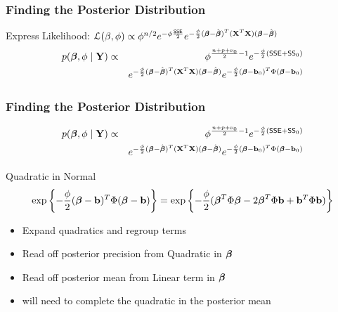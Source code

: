 \documentclass[handout]{beamer}\usepackage[]{graphicx}\usepackage[]{color}
\begin{document}
\begin{frame}
\frametitle{Finding the Posterior Distribution}
Express Likelihood: ${\cal{L}}(\beta, \phi) \propto \phi^{n/2} e^{- \phi \frac{\textsf{SSE}}{2}}
e^{-\frac{\phi}{2} (\boldsymbol{\beta} - \hat{\boldsymbol{\beta}})^T(\mathbf{X}^T\mathbf{X}) (\boldsymbol{\beta} - \hat{\boldsymbol{\beta}})}$ \pause
\begin{eqnarray*}
 p(\boldsymbol{\beta}, \phi \mid \mathbf{Y}) &\propto&  \phi^{\frac {n + p + \nu_0}{ 2} - 1}
 e^{- \frac \phi 2 ( \textsf{SSE} + \textsf{SS}_0) } \\
 & & e^{-\frac{\phi}{2} (\boldsymbol{\beta} - \hat{\boldsymbol{\beta}})^T(\mathbf{X}^T\mathbf{X}) (\boldsymbol{\beta} - \hat{\boldsymbol{\beta}})}
 e^{- \frac{\phi}{2} (\boldsymbol{\beta} - \mathbf{b}_0)^T \Phi (\boldsymbol{\beta} - \mathbf{b}_0) }
\end{eqnarray*} \pause


\end{frame}


\begin{frame}
\frametitle{Finding the Posterior Distribution}
\begin{eqnarray*}
 p(\boldsymbol{\beta}, \phi \mid \mathbf{Y}) &\propto&  \phi^{\frac {n + p + \nu_0}{ 2} - 1}
 e^{- \frac \phi 2 ( \textsf{SSE} + \textsf{SS}_0) } \\
 & & e^{-\frac{\phi}{2} (\boldsymbol{\beta} - \hat{\boldsymbol{\beta}})^T(\mathbf{X}^T\mathbf{X}) (\boldsymbol{\beta} - \hat{\boldsymbol{\beta}})}
 e^{- \frac{\phi}{2} (\boldsymbol{\beta} - \mathbf{b}_0)^T \Phi (\boldsymbol{\beta} - \mathbf{b}_0) }
\end{eqnarray*} \pause

Quadratic in Normal
$$\exp\left\{- \frac{\phi}{2} (\boldsymbol{\beta} - \mathbf{b})^T \Phi (\boldsymbol{\beta} - \mathbf{b}) \right\} = \exp\left\{-
  \frac{\phi}{2} (\boldsymbol{\beta}^T \Phi \boldsymbol{\beta} - 2 \boldsymbol{\beta}^T \Phi \mathbf{b} + \mathbf{b}^T\Phi \mathbf{b} )\right\}$$
\pause

  \begin{itemize}
  \item Expand quadratics and regroup terms \pause
  \item Read off posterior precision from Quadratic in $\boldsymbol{\beta}$ \pause
  \item Read off posterior mean from Linear term in $\boldsymbol{\beta}$ \pause
  \item will need to complete the quadratic in the posterior mean
  \end{itemize}
\end{frame}
\end{document}
